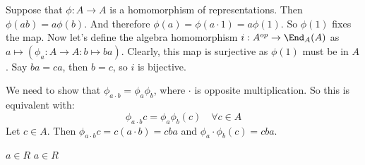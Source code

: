 Suppose that $\phi: A \to A$ is a homomorphism of representations. Then $\phi(ab)=a\phi(b)$.
And therefore $\phi(a)=\phi(a\cdot 1)=a\phi(1)$. So $\phi(1)$ fixes the map. Now let's define the algebra homomorphism $i : A^{op} \to \End_A(A) $ as $a \mapsto (\phi_a: A\to A: b \mapsto ba)$. Clearly, this map is surjective as $\phi(1)$ must be in $A$. Say $ba = ca$, then $b=c$, so $i$ is bijective.

We need to show that  $\phi_{a\cdot b}=\phi_a \phi_b$, where $\cdot$ is opposite multiplication. So this is equivalent with:
\[\phi_{a\cdot b}c = \phi_a \phi_b(c) \quad \forall c \in A \]
Let $c\in A$. Then $\phi_{a\cdot b}c = c(a\cdot b)=cba$ and $\phi_a \cdot \phi_b (c)= cba$.

$a ∈ R$ $a \in R$
